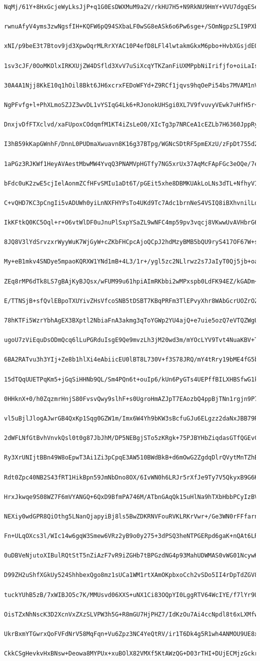 \documentclass[
    article,            %
    11pt,               %
    oneside,            %
    a4paper,            %
    english,            %
    brazil,             %
    sumario=tradicional,
    ]{abntex2}
\begin{document}
\begin{Verbatim}[frame=single, commandchars=\\\{\}, fontsize=\footnotesize]
    NqMj/61Y+8HxGcjeWyLksJjP+q1G0EsDWXMuM9a2V/rkHU7H5+N9RkNU9HmY+VVU7dgqESeo
    rwnuAfyV4yms3zwNgsfIH+KQFW6pQ94SXbaLF0wSG8eASk6o6Pw6sge+/SOmNgpzSLI9PXb6
    xNI/p9beE3t7Btov9jd3XpwOqrMLRrXYAC10P4efD8LFl4lwtakmGkxM6pbo+HvbXGsjdEOf
    1sv3cJF/0OoMKOlxIRKXUjZW4DSfld3XvV7uSiXcqYTKZanFiUXMPpbNiIrifjfo+oiLaIsY
    30A4A1Njj8KkE10q1hOil8Bkt6JH6xcrxFEDoWFYd+Z9RCf1jqvs9hqOePi54bs7MVAM1nVG
    NgPFvfg+l+PhXLmoSZJZ3wvDL1vYSIqG4Lk6+RJonokUHSgi0XL7V9fvuvyVEwk7uHfH5r+A
    DnxjvDfFTXclvd/xaFUpoxCOdqmfM1KT4iZsLeO0/XIcTg3p7NRCeA1cEZLb7H6360JppRyl
    I3hB59kKapGWnhF/DnnL0PUDmaXwuavn8K16g37BTpg/WGNcSDtRF5pmEXzU/zFpDt755d2C
    1aPGz3RJKWf1HeyAVAestMbwMW4YvqQ3PNAMVpHGTfy7NG5xrUx37AqMcFApFGc3eOQe/7ef
    bFdc0uK2zwE5cjIelAonmZCfHFvSMIu1aDt6T/pGEit5xhe8DBMKUAkLoLNs3dTL+NfhyVIG
    C+vQHD7KC3pCngIi5vADUWh0yiLnNXFHYPsTo4UKd9Tc7Adc1brnNeS4VSIQ8iBXhvnilLoa
    IkKFtkQ0KC5Oql+r+O6vtWlDF0uJnuPlSxpYSaZL9wNFC4mp59pv3vqcj8VKwwUvAVHbrG6b
    8JQ8V3lYdSrvzxrWyyWuK7WjGyW+cZKbFHCpcAjoQCpJ2hdMzyBMB5bQU9ryS417OF67W+s0
    My+eB1mkv4SNDye5mpaoKQRXW1YNd1mB+4L3/1r+/ygl5zc2NLlrwz2s7JaIyT0Qj5jb+oaa
    ZEq8rMP6dTk8LS7gBAjKyBJQsx/wFUM99u61hpiAImRKbbi2wMPxspb0LdFK94EZ/kGADm+T
    E/TTNSjB+sfQvlEBpoTXUYivZHsVfcoSNB5tDSBT7KBqPRFm3TlEPvyXhr8WAbGcrUOZrOZ3
    78hKTFi5WzrYbhAgEX3BXptl2NbiaFnA3akmg3qToYGWp2YU4ajQ+e7uie5ozQ7eVTQZWgUV
    ugoU7zViEquDsODmQcq6lLuPGRduIsgE9Qe9mvzLh3jM20wd3m/mYOcLYV9Tvt4NuaKBV+T/
    6BA2RATvu3h3YIj+Ze8b1hlXi4eAbiicEU0lBT8L730V+f3S78JRQ/mY4tRry19bME4fG5bp
    15dTQqUUETPqKm5+jGqSiHHNb9QL/Sm4PQn6t+ouIp6/kUn6PyGTs4UEPffBILXHBSfwG1kS
    0HHknX+0/h0ZqzmrHnjS80FvsvQwy9slhF+s0UgroHmAZJpT7EAozbQ4ppBjTNn1rgjn9P7y
    vl5uBjlJlogAJwrGB4QxKp1Sqg0GZW1m/Imx6W4Yh9bKW3sBcfuGJu6ELgzz2daNxJBB79Rg
    2dWFLNfGtBvhVnvkQsl0t0g87JbJhM/DP5NEBgjSTo5zKRgk+75PJBYHbZiqdasGTfQGEvCq
    Ry3XrUNIjtBBn49W8oEpwT3Ai1Zi3pCpqE3AW510BWdBkB+d6mOwG2ZgdqDlrQVytMnTZhBI
    Rdt0Zpc40NB2S43fRT1HikBpn59JmNbDno8OX/6IvWN0h6LRJr5rXfJe9Ty7V5QkyxB9G6Kw
    HrxJkwqe9S08WZ7F6mVYANGQ+6QxD9BfmPA746M/ATbnGAqQk15uHlNa9hTXbHbbPCyIzBVD
    NEXiy0wdGPR8QiOthg5LNanQjapyiBj8ls5BwZDKRNVFouRVKLRKrVwr+/Ge3WN0rFFfarnT
    Fn+ULqOXcs3l/WIc14w6gqW3Smew6VRz2yB9o0y275+3dPSQ3heNTPGERpd6gaK+nQAt6LRZ
    0uDBVeNjutoXIBulRQtStT5nZiAzF7vR9iZGHb7tBPGzdNG4p93MahUDWMAS0vWG01NcywKA
    D99ZH2uShfXGkUy524ShhbexQgo8mz1sUCa1WM1rtXAmOKpbxoCch2vSDo5II4rDpTdZGV84
    tuckYUhB5zB/7xWIBJO5c7K/MMUsvd06XXS+uNX1Ci83OQpYI0LggRTV64WcIYE/f7lYr9UH
    OisTZxNhNscK3D2XcnVxZXzSLVPW3h5G+R8mGU7HjPHZ7/IdKzOu7Ai4ccNpdl8t6xLXMfw0
    UkrBxmYTGwrxQoFVFdNrV58MqFqn+Vu6Zpz3NC4YeQtRV/ir1T6Dk4g5R1wh4ANMOU9UE8xb
    CkkCSgHevkvHxBNsw+Deowa8MYPUx+xuBOlX82VMXf5KtAWzQG+D03rTHI+DUjECMjzGckrd

\end{Verbatim}
\end{document}
